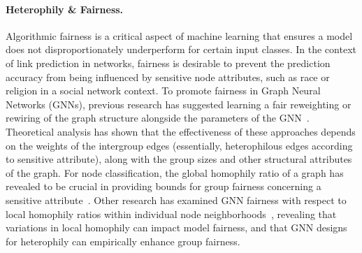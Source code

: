 \paragraph{Heterophily \& Fairness.}
Algorithmic fairness is a critical aspect of machine learning that ensures a model does not disproportionately underperform for certain input classes. In the context of link prediction in networks, fairness is desirable to prevent the prediction accuracy from being influenced by sensitive node attributes, such as race or religion in a social network context. To promote fairness in Graph Neural Networks (GNNs), previous research has suggested learning a fair reweighting or rewiring of the graph structure alongside the parameters of the GNN~\cite{li2021dyadic,spinelli2021fairdrop}. Theoretical analysis has shown that the effectiveness of these approaches depends on the weights of the intergroup edges (essentially, heterophilous edges according to sensitive attribute), along with the group sizes and other structural attributes of the graph.
For node classification, the global homophily ratio of a graph has revealed to be crucial in providing bounds for group fairness concerning a sensitive attribute~\cite{wang2022improving}. Other research has examined GNN fairness with respect to local homophily ratios within individual node neighborhoods~\cite{loveland2022graph}, revealing that variations in local homophily can impact model fairness, and that GNN designs for heterophily can empirically enhance group fairness.

